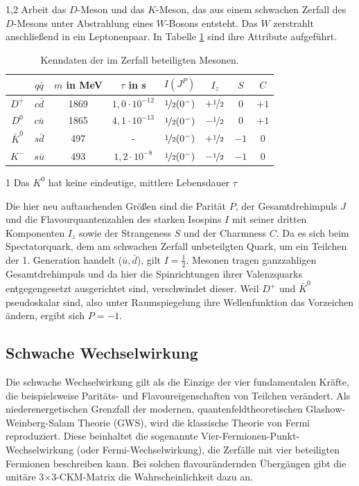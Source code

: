 \documentclass[11pt,a4paper,twoside]{report}
\begin{document}
\begin{spacing}{1,2}
Arbeit das $D$-Meson und das $K$-Meson, das aus einem schwachen Zerfall des $D$-Mesons unter Abstrahlung eines $W$-Bosons entsteht. Das $W$ zerstrahlt 
anschließend in ein Leptonenpaar. In Tabelle \ref{tab_DKMeson} sind ihre Attribute \cite{PDG} aufgeführt.
\begin{table}[H]
\begin{threeparttable}[H]
\begin{tabular}{c|ccc|cccc} \toprule 
  & $q\bar q$ &  $m$ in MeV & $\tau$ in s & $I(J^P)$ & $I_z$ & $S$ & $C$\\
 \midrule
  $D^+$ & $c\bar d$ & 1869 & $1,0\cdot10^{-12}$ & $\nicefrac12(0^-)$ & $+\nicefrac12$ & 0 & $+1$\\
  $D^0$ & $c\bar u$ & 1865 & $4,1\cdot10^{-13}$  & $\nicefrac12(0^-)$ & $-\nicefrac12$ & 0 & $+1$\\
  $\bar K^0$ & $s\bar d$ & 497 & -\tnote{1} & $\nicefrac12(0^-)$ & $+\nicefrac12$ & $-1$& 0\\
  $K^-$ & $s\bar u $ & 493 & $1,2\cdot10^{-8}$ & $\nicefrac12(0^-)$ & $-\nicefrac12$ & $-1$ & 0
\\\bottomrule \bottomrule
 \end{tabular}
 \begin{tablenotes}
 \item[1] \small{Das $K^0$ hat keine eindeutige, mittlere Lebensdauer $\tau$}
  \end{tablenotes}
\caption{Kenndaten der im Zerfall beteiligten Mesonen.}
\label{tab_DKMeson}
\end{threeparttable}
\end{table}
\noindent
Die hier neu auftauchenden Größen sind die Parität $P$, der Gesamtdrehimpuls $J$ und die Flavourquantenzahlen des starken Isospins $I$ mit 
seiner dritten Komponenten $I_z$ sowie der Strangeness $S$ und der Charmness $C$. Da es sich beim Spectatorquark, dem am schwachen Zerfall unbeteilgten 
Quark, um ein Teilchen der 1. Generation 
handelt ($\bar u, \bar d$), gilt $I = \frac12$.  Mesonen tragen ganzzahligen Gesamtdrehimpuls und da hier die Spinrichtungen ihrer Valenzquarks 
entgegengesetzt ausgerichtet sind, verschwindet dieser. Weil $D^+$ und $\bar K^0$ pseudoskalar sind, also unter Raumspiegelung ihre Wellenfunktion das 
Vorzeichen ändern, ergibt sich $P=-1$.

\subsection{Schwache Wechselwirkung}
\label{sec_schwacheWW}
Die schwache Wechselwirkung gilt als die Einzige der vier fundamentalen Kräfte, die beispielsweise Paritäts- und Flavoureigenschaften von Teilchen verändert.
Als niederenergetischen Grenzfall der modernen, quantenfeldtheoretischen Glashow-Weinberg-Salam Theorie (GWS), wird die klassische Theorie von Fermi 
reproduziert. Diese beinhaltet die
sogenannte Vier-Fermionen-Punkt-Wechselwirkung (oder Fermi-Wechselwirkung), die Zerfälle mit vier beteiligten Fermionen beschreiben kann. Bei solchen
flavourändernden Übergängen gibt die unitäre 3$\times$3-CKM-Matrix die Wahrscheinlichkeit dazu an. 


\end{spacing}
\end{document}
